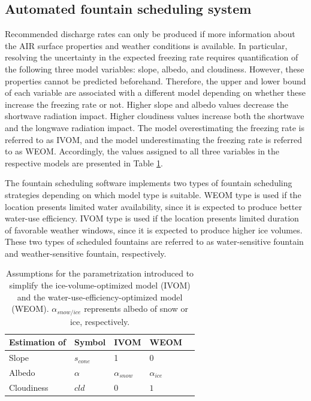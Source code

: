 \subsection{Automated fountain scheduling system}

Recommended discharge rates can only be produced if more information about the AIR surface properties and
weather conditions is available. In particular, resolving the uncertainty in the expected freezing rate requires
quantification of the following three model variables: slope, albedo, and cloudiness. However, these properties
cannot be predicted beforehand. Therefore, the upper and lower bound of each variable are associated with a
different model depending on whether these increase the freezing rate or not.  Higher slope and albedo values
decrease the shortwave radiation impact. Higher cloudiness values increase both the shortwave and the longwave
radiation impact. The model overestimating the freezing rate is referred to as \ac{IVOM}, and the model
underestimating the freezing rate is referred to as  \ac{WEOM}. Accordingly, the values
assigned to all three variables in the respective models are presented in Table \ref{tab:assumptions}.

The fountain scheduling software implements two types of fountain scheduling strategies depending on which
model type is suitable. \ac{WEOM} type is used if the location presents limited water availability, since it is expected to
produce better water-use efficiency. \ac{IVOM} type is used if the location presents limited duration of favorable
weather windows, since it is expected to produce higher ice volumes. These two types of scheduled fountains are referred to as water-sensitive fountain and weather-sensitive fountain, respectively.

\begin{table}[htb]
	\centering
	\caption{Assumptions for the parametrization introduced to simplify the ice-volume-optimized model (IVOM) and
		the water-use-efficiency-optimized model (WEOM). $\alpha_{snow/ice}$ represents albedo of snow or ice, respectively.}
	\label{tab:assumptions}
	\begin{tabular}{|lllll|}
		\toprule
		\textbf{Estimation of}          & \textbf{Symbol} & \textbf{IVOM}   & \textbf{WEOM}  &                       \\\midrule
		\multicolumn{1}{|l}{Slope}      & $s_{cone}$      & 1               & 0              & \multicolumn{1}{l|}{} \\
		\multicolumn{1}{|l}{Albedo}     & $\alpha$        & $\alpha_{snow}$ & $\alpha_{ice}$ & \multicolumn{1}{l|}{} \\
		\multicolumn{1}{|l}{Cloudiness} & $cld$           & $0$             & $1$            & \multicolumn{1}{l|}{} \\\bottomrule
	\end{tabular}
\end{table}

